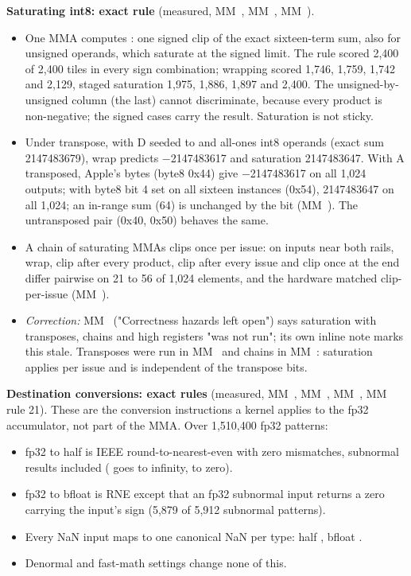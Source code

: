 \textbf{Saturating int8: exact rule} (measured, MM~, MM~, MM~).

\begin{itemize}
\item One MMA computes : one signed clip of the exact sixteen-term sum, also for
  unsigned operands, which saturate at the signed limit. The rule scored 2,400 of 2,400 tiles in every sign
  combination; wrapping scored 1,746, 1,759, 1,742 and 2,129, staged saturation 1,975, 1,886, 1,897 and 2,400. The
  unsigned-by-unsigned column (the last) cannot discriminate, because every product is non-negative; the signed cases
  carry the result. Saturation is not sticky.
\item Under transpose, with D seeded to  and all-ones int8 operands (exact sum 2147483679), wrap
  predicts −2147483617 and saturation 2147483647. With A transposed, Apple's bytes (byte8 0x44) give −2147483617 on all
  1,024 outputs; with byte8 bit 4 set on all sixteen  instances (0x54), 2147483647 on all 1,024; an in-range sum
  (64) is unchanged by the bit (MM~). The untransposed pair (0x40, 0x50) behaves the same.
\item A chain of saturating MMAs clips once per issue: on inputs near both rails, wrap, clip after every
  product, clip after every issue and clip once at the end differ pairwise on 21 to 56 of 1,024 elements, and the
  hardware matched clip-per-issue (MM~).
\item \emph{Correction:} MM~ ("Correctness hazards left open") says saturation with transposes, chains and high registers
  "was not run"; its own inline note marks this stale. Transposes were run in MM~ and chains in MM~: saturation
  applies per issue and is independent of the transpose bits.
\end{itemize}

\textbf{Destination conversions: exact rules} (measured, MM~, MM~, MM~, MM~ rule 21). These are the conversion
instructions a kernel applies to the fp32 accumulator, not part of the MMA. Over 1,510,400 fp32 patterns:

\begin{itemize}
\item fp32 to half is IEEE round-to-nearest-even with zero mismatches, subnormal results included ( goes to
  infinity,  to zero).
\item fp32 to bfloat is RNE except that an fp32 subnormal input returns a zero carrying the input's sign (5,879 of
  5,912 subnormal patterns).
\item Every NaN input maps to one canonical NaN per type: half , bfloat .
\item Denormal and fast-math settings change none of this.
\end{itemize}

